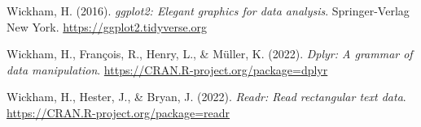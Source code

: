 \documentclass[
  man,floatsintext]{apa6}
\newlength{\cslhangindent}
\newlength{\cslentryspacingunit} %
\newenvironment{CSLReferences}[2] %
 {%
  \setlength{\parindent}{0pt}
  \ifodd #1
  \let\oldpar\par
  \def\par{\hangindent=\cslhangindent\oldpar}
  \fi
  \setlength{\parskip}{#2\cslentryspacingunit}
 }%
 {}
\begin{document}
\begin{CSLReferences}{1}{0}
\leavevmode{}%
Wickham, H. (2016). \emph{ggplot2: Elegant graphics for data analysis}. Springer-Verlag New York. \url{https://ggplot2.tidyverse.org}

\leavevmode{}%
Wickham, H., François, R., Henry, L., \& Müller, K. (2022). \emph{Dplyr: A grammar of data manipulation}. \url{https://CRAN.R-project.org/package=dplyr}

\leavevmode{}%
Wickham, H., Hester, J., \& Bryan, J. (2022). \emph{Readr: Read rectangular text data}. \url{https://CRAN.R-project.org/package=readr}

\end{CSLReferences}
\end{document}
